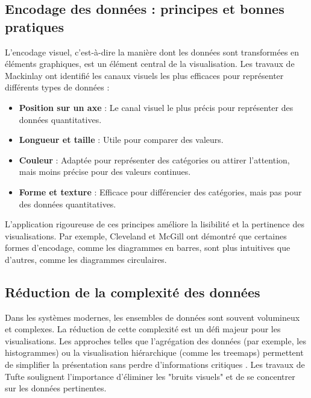 \documentclass[runningheads]{llncs}
\begin{document}
\subsection{Encodage des données : principes et bonnes pratiques}
L'encodage visuel, c'est-à-dire la manière dont les données sont transformées en éléments graphiques, est un élément central de la visualisation. Les travaux de Mackinlay \cite{mackinlay_automating_1986} ont identifié les canaux visuels les plus efficaces pour représenter différents types de données :
\begin{itemize}
    \item \textbf{Position sur un axe} : Le canal visuel le plus précis pour représenter des données quantitatives.
    \item \textbf{Longueur et taille} : Utile pour comparer des valeurs.
    \item \textbf{Couleur} : Adaptée pour représenter des catégories ou attirer l’attention, mais moins précise pour des valeurs continues.
    \item \textbf{Forme et texture} : Efficace pour différencier des catégories, mais pas pour des données quantitatives.
\end{itemize}

L'application rigoureuse de ces principes améliore la lisibilité et la pertinence des visualisations. Par exemple, Cleveland et McGill \cite{cleveland_graphical_1984} ont démontré que certaines formes d'encodage, comme les diagrammes en barres, sont plus intuitives que d'autres, comme les diagrammes circulaires.

\subsection{Réduction de la complexité des données}
Dans les systèmes modernes, les ensembles de données sont souvent volumineux et complexes. La réduction de cette complexité est un défi majeur pour les visualisations. Les approches telles que l'agrégation des données (par exemple, les histogrammes) ou la visualisation hiérarchique (comme les treemaps) permettent de simplifier la présentation sans perdre d'informations critiques \cite{johnson_hierarchical_1991}. Les travaux de Tufte \cite{tufte_visual_2001} soulignent l’importance d’éliminer les "bruits visuels" et de se concentrer sur les données pertinentes.
\end{document}
